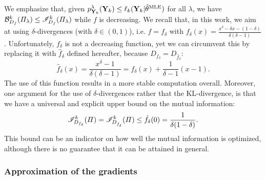 We emphasize that, 
given  $p^{\lambda}_{\mathbf{Y}_k}(\mathbf{Y}_k) \leq  \ell_k(\mathbf{Y}_k|\hat{\theta}^{\text{MLE}})$ for all $\lambda$, we have  $\mathcal{B}^k_{D_f}(\varPi_{\lambda}) \leq \mathscr{I}^k_{D_f}(\varPi_{\lambda})$ while $f$ is decreasing.
We recall that, in this work, we aim at using $\delta$-divergences (with $\delta\in(0,1)$), i.e. 
$f=f_\delta$ with %
$f_\delta(x) = \frac{x^\delta-\delta x-(1-\delta)}{\delta(\delta-1)}$.
Unfortunately, $f_\delta$ is not a decreasing function, yet we can circumvent this by replacing it with $\hat{f}_\delta$ defined hereafter, because  $D_{f_\delta}=D_{\hat{f}_\delta}$: 
\begin{equation}
    \hat{f}_{\delta}(x) = \frac{x^{\delta}-1}{\delta(\delta-1)} = f_{\delta}(x) + \frac{1}{\delta-1}(x-1) .
\end{equation}
The use of this function results in a more stable computation overall.
Moreover, one argument for the use of $\delta$-divergences rather that the KL-divergence, is that we have a universal and explicit upper bound on the mutual information: 
\begin{equation}
    \mathscr{I}^k_{D_{f_\delta}}(\varPi) = \mathscr{I}^k_{D_{\hat{f}_{\delta}}}(\varPi) \leq \hat{f}_{\delta}(0) = \frac{1}{\delta(1-\delta)} .
\end{equation}
This bound can be an indicator on how well the mutual information is optimized, although there is no guarantee that it can be attained in general.




\subsubsection{Approximation of the gradients}\label{sec:VARP:gradapprox}

